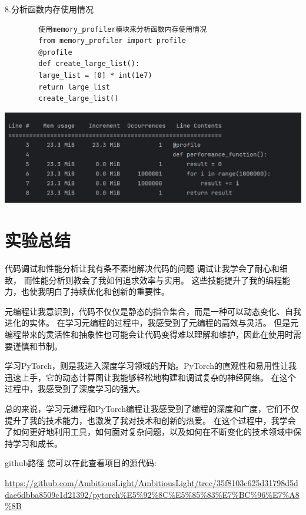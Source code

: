 \documentclass{article}
\begin{document}
	8.分析函数内存使用情况
	\begin{verbatim}
		使用memory_profiler模块来分析函数内存使用情况
		from memory_profiler import profile
		@profile
		def create_large_list():
		large_list = [0] * int(1e7)
		return large_list
		create_large_list()
	\end{verbatim}
	
	\noindent
	\begin{minipage}{\linewidth}
		\centering
		\includegraphics[width=0.5\linewidth]{example20.png}
		\label{fig:example}
	\end{minipage}
	
	\section{实验总结}
	代码调试和性能分析让我有条不紊地解决代码的问题
	调试让我学会了耐心和细致，
	而性能分析则教会了我如何追求效率与实用。
	这些技能提升了我的编程能力，也使我明白了持续优化和创新的重要性。
	
	元编程让我意识到，代码不仅仅是静态的指令集合，而是一种可以动态变化、自我进化的实体。
	在学习元编程的过程中，我感受到了元编程的高效与灵活。
	但是元编程带来的灵活性和抽象性也可能会让代码变得难以理解和维护，因此在使用时需要谨慎和节制。
	
	学习PyTorch，则是我进入深度学习领域的开始。PyTorch的直观性和易用性让我迅速上手，它的动态计算图让我能够轻松地构建和调试复杂的神经网络。
	在这个过程中，我感受到了深度学习的强大。
	
	总的来说，学习元编程和PyTorch编程让我感受到了编程的深度和广度，它们不仅提升了我的技术能力，也激发了我对技术和创新的热爱。
	在这个过程中，我学会了如何更好地利用工具，如何面对复杂问题，以及如何在不断变化的技术领域中保持学习和成长。
	
	github路径
	您可以在此查看项目的源代码: 
	
	\url{https://github.com/AmbitiousLight/AmbitiousLight/tree/35f8103c625d31798d5ddae6dbba8509c1d21392/pytorch%E5%92%8C%E5%85%83%E7%BC%96%E7%A8%8B}
	
	
\end{document}

